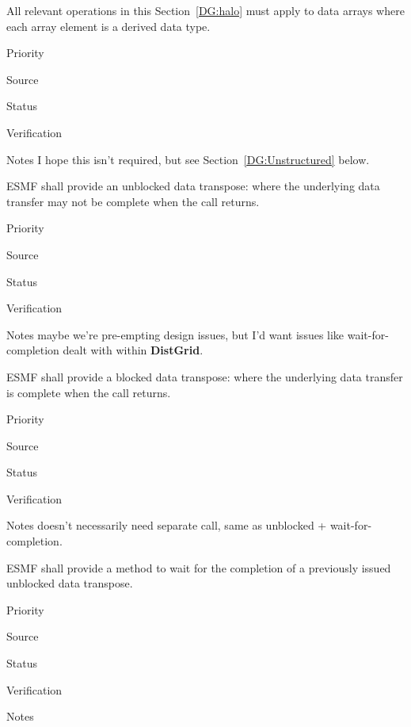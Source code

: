 
All relevant operations in this Section~\ref{DG:halo} must apply to
data arrays where each array element is a derived data type.

\begin{reqlist}
\item[Priority]
\item[Source]
\item[Status]
\item[Verification]
\item[Notes] I hope this isn't required, but see
  Section~\ref{DG:Unstructured} below.
\end{reqlist}

 \label{DG:Transpose}


ESMF shall provide an unblocked data transpose: where the underlying
data transfer may not be complete when the call returns.

\begin{reqlist}
\item[Priority]
\item[Source]
\item[Status]
\item[Verification]
\item[Notes] maybe we're pre-empting design issues, but I'd want
  issues like wait-for-completion dealt with within \textbf{DistGrid}.
\end{reqlist}


ESMF shall provide a blocked data transpose: where the underlying
data transfer is complete when the call returns.

\begin{reqlist}
\item[Priority]
\item[Source]
\item[Status]
\item[Verification]
\item[Notes] doesn't necessarily need separate call, same as unblocked
  + wait-for-completion.
\end{reqlist}


ESMF shall provide a method to wait for the completion of a previously
issued unblocked data transpose.

\begin{reqlist}
\item[Priority]
\item[Source]
\item[Status]
\item[Verification]
\item[Notes]
\end{reqlist}

